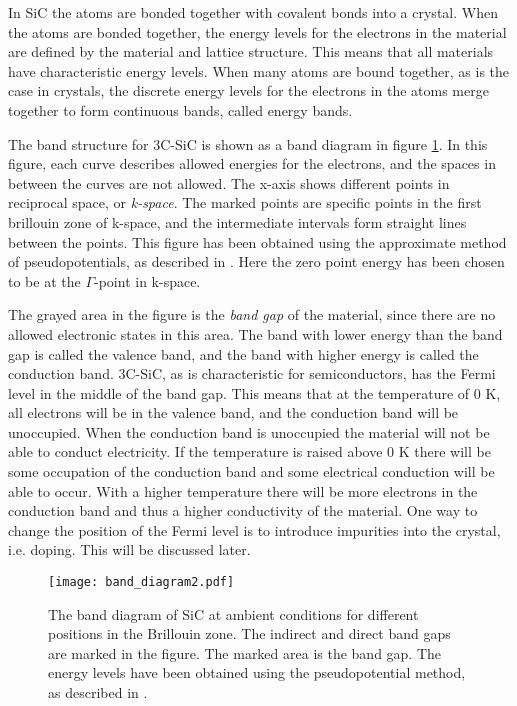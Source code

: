 In SiC the atoms are bonded together with covalent bonds into a crystal. When the atoms are bonded together, the energy levels for the electrons in the material are defined by the material and lattice structure. This means that all materials have characteristic energy levels. When many atoms are bound together, as is the case in crystals, the discrete energy levels for the electrons in the atoms merge together to form continuous bands, called energy bands. 

The band structure for 3C-SiC is shown as a band diagram in figure \ref{fig:band}. In this figure, each curve describes allowed energies for the electrons, and the spaces in between the curves are not allowed. The x-axis shows different points in reciprocal space, or \emph{k-space}. The marked points are specific points in the first brillouin zone of k-space, and the intermediate intervals form straight lines between the points. This figure has been obtained using the approximate method of pseudopotentials, as described in \cite{Aourag1994}. Here the zero point energy has been chosen to be at the $\Gamma$-point in k-space. 

The grayed area in the figure is the \emph{band gap} of the material, since there are no allowed electronic states in this area. The band with lower energy than the band gap is called the valence band, and the band with higher energy is called the conduction band. 3C-SiC, as is characteristic for semiconductors, has the Fermi level in the middle of the band gap. This means that at the temperature of 0 K, all electrons will be in the valence band, and the conduction band will be unoccupied. When the conduction band is unoccupied the material will not be able to conduct electricity. If the temperature is raised above 0 K there will be some occupation of the conduction band and some electrical conduction will be able to occur. With a higher temperature there will be more electrons in the conduction band and thus a higher conductivity of the material. One way to change the position of the Fermi level is to introduce impurities into the crystal, i.e. doping. This will be discussed later. 

\begin{figure}[h]
\begin{center}
\texttt{[image: band\_diagram2.pdf]}
\caption{The band diagram of SiC at ambient conditions for different positions in the Brillouin zone. The indirect and direct band gaps are marked in the figure. The marked area is the band gap. The energy levels have been obtained using the pseudopotential method, as described in \cite{Aourag1994}.
\label{fig:band}}
\end{center}
\end{figure}

